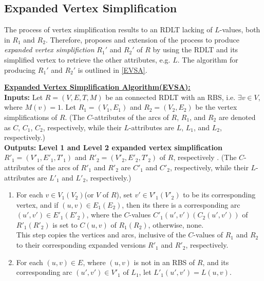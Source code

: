 \subsection*{Expanded Vertex Simplification}
The process of vertex simplification results to an RDLT lacking of $L$-values, both in $R_1$ and $R_2$. Therefore, \cite{MalinaoWCTP2023} proposes and extension of the process to produce \emph{expanded vertex simplifiction} $R_1'$ and $R_2'$ of $R$ by using the RDLT and its simplified vertex to retrieve the other attributes, e.g. $L$. The algorithm for producing $R_1'$ and $R_2'$ is outlined in \ref{EVSA}.
\begin{algorithm}
    \label{EVSA}
    \underline{\textbf{Expanded Vertex Simplification Algorithm(EVSA):}}\\
    \textbf{Inputs:} Let $R = (V, E, T, M)$ be an connected RDLT with an RBS, i.e. $\exists v \in V$, where $M(v) = 1$. Let $R_1 = (V_1, E_1)$ and $R_2 = (V_2, E_2)$ be the vertex simplifications of $R$. (The $C$-attributes of the arcs of $R$, $R_1$, and $R_2$ are denoted as $C$, $C_1$, $C_2$, respectively, while their $L$-attributes are $L$, $L_1$, and $L_2$, respectively.) \\

    \noindent
    \textbf{Outputs:} \textbf{Level 1 and Level 2 expanded vertex simplification} $R'_1 = (V'_1, E'_1, T'_1)$ and $R'_2 = (V'_2, E'_2, T'_2)$ of $R$, respectively . (The $C$-attributes of the arcs of $R'_1$ and $R'_2$ are $C'_1$ and $C'_2$, respectively, while their $L$-attributes are $L'_1$ and $L'_2$, respectively.)

    \begin{enumerate}
        \item For each $v \in V_1(V_2)$(or $V$ of $R$), set $v' \in V'_1(V'_2)$ to be its corresponding vertex, and if $(u,v) \in E_1(E_2)$, then its there is a corresponding arc $(u',v') \in E'_1(E'_2)$, where the $C$-values $C'_1(u',v')(C_2(u',v'))$ of $R'_1(R'_2)$ is set to $C(u,v)$ of $R_1(R_2)$, otherwise, none.  \\

        This step copies the vertices and arcs, inclusive of the $C$-values of $R_1$ and $R_2$ to their corresponding expanded versions $R'_1$ and $R'_2$, respectively. 

        \item For each $(u,v) \in E$, where $(u,v)$ is not in an RBS of $R$, and its corresponding arc $(u',v') \in V'_1$ of $L_1$, let $L'_1(u',v') = L(u,v)$. \\


\end{enumerate}
\end{algorithm}
